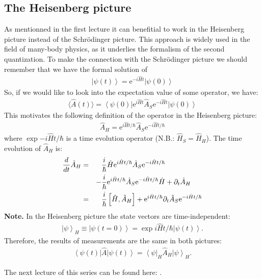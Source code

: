 \documentclass[10pt]{article}
\let\cite\citep
\providecommand\citep{\cite}
\newcommand{\bra}[1]{\ensuremath{\left\langle#1\right|}}
\newcommand{\ket}[1]{\ensuremath{\left|#1\right\rangle}}
\newcommand{\eexp}[1]{\mathrm{e}^{#1}}
\begin{document}
\subsection{The Heisenberg picture}
As mentionned in the first lecture it can benefitial to work in the Heisenberg picture instead of the Schrödinger picture. This approach is widely used in the field of many-body physics, as it underlies the formalism of the second quantization. To make the connection with  the Schrödinger picture we should remember that we have the formal solution of
\begin{align}
\ket{\psi(t)} = \eexp{-i\hat{H}t}\ket{\psi(0)}
\end{align}
So, if we would like to look into the expectation value of some operator, we have:
\begin{align}
\langle\hat{A}(t)\rangle = \bra{\psi(0)}\eexp{i\hat{H}t}\hat{A}_S\eexp{-i\hat{H}t}\ket{\psi(0)}
\end{align}
This motivates the following definition of the operator in the Heisenberg picture:
\begin{align}
    \hat{A}_H=\eexp{i{\hat{H} t}/{\hbar}} \hat{A}_S \eexp{-i{\hat{H} t}/{\hbar}}
\end{align}
where $\exp{-i{\hat{H} t}/{\hbar}}$ is a time evolution operator (N.B.: $\hat{H}_S = \hat{H}_H$). The time evolution of $\hat{A}_H$ is:
\begin{align}
    \notag \frac{d}{dt} \hat{A}_H &=&& \frac{i}{\hbar}\hat{H}\eexp{i{\hat{H}t}/{\hbar}}\hat{A}_S \eexp{-i{\hat{H} t}/{\hbar}}\\ 
    &&-&\frac{i}{\hbar} \eexp{i{\hat{H} t}/{\hbar}}\hat{A}_S \eexp{-i{\hat{H}t}/{\hbar}}\hat{H}+\partial_t \hat{A}_H\\
    &=&& \frac{i}{\hbar}\left[\hat{H},\hat{A}_H\right] + \eexp{i{\hat{H}t}/{\hbar}}\partial_t\hat{A}_S\eexp{-i{\hat{H}t}/{\hbar}}
\end{align}
\textbf{Note.} In the Heisenberg picture the state vectors are time-independent:
\begin{align}
    \ket{\psi}_H \equiv \ket{\psi(t=0)}=\exp{i{\hat{H}}t/{\hbar}} \ket{\psi(t)}.
\end{align}
Therefore, the results of measurements are the same in both pictures:
\begin{align}
 \bra{\psi(t)}\hat{A}\ket{\psi(t)} = \bra{\psi}_H \hat{A}_H \ket{\psi}_H.
 \end{align}

The next lecture of this series can be found here: \cite{Jendrzejewski}.

\FloatBarrier


\end{document}
